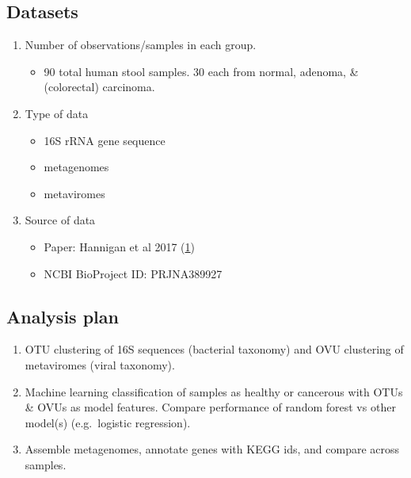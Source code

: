 \documentclass[11pt,]{article}
\providecommand{\tightlist}{%
  \setlength{\itemsep}{0pt}\setlength{\parskip}{0pt}}
\begin{document}
\hypertarget{datasets}{%
\subsection{Datasets}\label{datasets}}

\begin{enumerate}
\def\labelenumi{\arabic{enumi}.}
\tightlist
\item
  Number of observations/samples in each group.

  \begin{itemize}
  \tightlist
  \item
    90 total human stool samples. 30 each from normal, adenoma, \&
    (colorectal) carcinoma.
  \end{itemize}
\item
  Type of data

  \begin{itemize}
  \tightlist
  \item
    16S rRNA gene sequence
  \item
    metagenomes
  \item
    metaviromes
  \end{itemize}
\item
  Source of data

  \begin{itemize}
  \tightlist
  \item
    Paper: Hannigan et al 2017
    (\protect\hyperlink{ref-hannigan_diagnostic_2017}{1})
  \item
    NCBI BioProject ID: PRJNA389927
  \end{itemize}
\end{enumerate}

\hypertarget{analysis-plan}{%
\subsection{Analysis plan}\label{analysis-plan}}

\begin{enumerate}
\def\labelenumi{\arabic{enumi}.}
\tightlist
\item
  OTU clustering of 16S sequences (bacterial taxonomy) and OVU
  clustering of metaviromes (viral taxonomy).
\item
  Machine learning classification of samples as healthy or cancerous
  with OTUs \& OVUs as model features. Compare performance of random
  forest vs other model(s) (e.g.~logistic regression).
\item
  Assemble metagenomes, annotate genes with KEGG ids, and compare across
  samples.
\end{enumerate}
\end{document}
